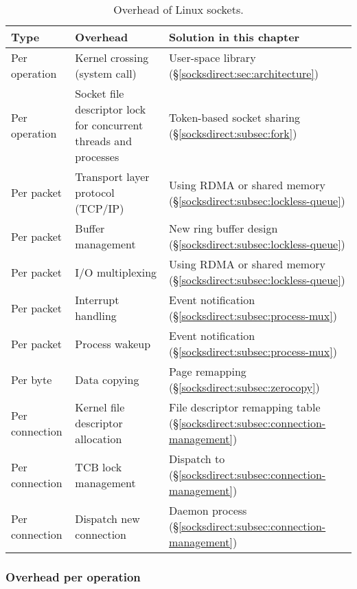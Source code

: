 \begin{table}[t]
	\centering
	\caption{Overhead of Linux sockets.}
	\label{socksdirect:tab:overhead}
	\small
		\begin{tabularx}{1\textwidth}{l|X|X}
			\hline
			Type & Overhead & Solution in this chapter \\
			\hline
			\hline
			Per operation & Kernel crossing (system call) & User-space library (\S\ref{socksdirect:sec:architecture}) \\
			\hline
			Per operation & Socket file descriptor lock for concurrent threads and processes & Token-based socket sharing (\S\ref{socksdirect:subsec:fork}) \\
			\hline
			\hline
			Per packet & Transport layer protocol (TCP/IP) & Using RDMA or shared memory (\S\ref{socksdirect:subsec:lockless-queue}) \\
			\hline
			Per packet & Buffer management & New ring buffer design (\S\ref{socksdirect:subsec:lockless-queue}) \\
			\hline
			Per packet & I/O multiplexing & Using RDMA or shared memory (\S\ref{socksdirect:subsec:lockless-queue}) \\
			\hline
			Per packet & Interrupt handling & Event notification (\S\ref{socksdirect:subsec:process-mux}) \\
			\hline
			Per packet & Process wakeup & Event notification (\S\ref{socksdirect:subsec:process-mux}) \\
			\hline
			\hline
			Per byte & Data copying & Page remapping (\S\ref{socksdirect:subsec:zerocopy}) \\
			\hline
			\hline
			Per connection  & Kernel file descriptor allocation & File descriptor remapping table (\S\ref{socksdirect:subsec:connection-management}) \\
			\hline
			Per connection & TCB lock management & Dispatch to \libipc{} (\S\ref{socksdirect:subsec:connection-management}) \\
			\hline
			Per connection & Dispatch new connection & Daemon process (\S\ref{socksdirect:subsec:connection-management}) \\
			\hline
		\end{tabularx}
\end{table}

\subsubsection{Overhead per operation}
\label{socksdirect:subsec:per-operation-overhead}

